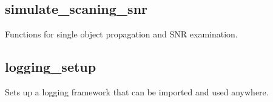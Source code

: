 \documentclass[letterpaper,10pt,english]{sphinxmanual}
\begin{document}
\subsection{simulate\_scaning\_snr}
\label{\detokenize{modules/simulate_scaning_snr:module-simulate_scaning_snr}}\label{\detokenize{modules/simulate_scaning_snr:simulate-scaning-snr}}\label{\detokenize{modules/simulate_scaning_snr::doc}}
Functions for single object propagation and SNR examination.

\begin{fulllineitems}
\label{\detokenize{modules/simulate_scaning_snr:simulate_scaning_snr.simulate_full_scaning_snr_curve}}
\end{fulllineitems}



\subsection{logging\_setup}
\label{\detokenize{modules/logging_setup:module-logging_setup}}\label{\detokenize{modules/logging_setup:logging-setup}}\label{\detokenize{modules/logging_setup::doc}}
Sets up a logging framework that can be imported and used anywhere.

\begin{fulllineitems}
\label{\detokenize{modules/logging_setup:logging_setup.add_logging_level}}
\end{fulllineitems}


\begin{fulllineitems}
\label{\detokenize{modules/logging_setup:logging_setup.class_log_call}}
\end{fulllineitems}
\end{document}

